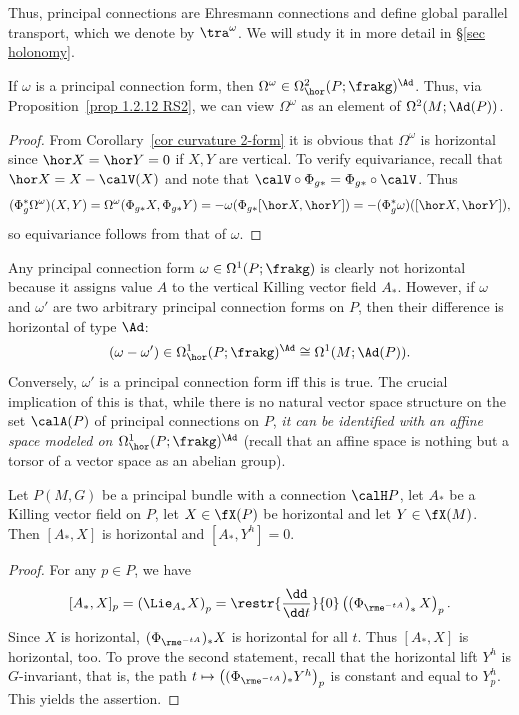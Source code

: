Thus, principal connections are Ehresmann connections and define global parallel transport, which we denote by $\tra^\omega$. We will study it in more detail in \S\ref{sec holonomy}.


\begin{cor}
    If $\omega$ is a principal connection form, then $\Omega^\omega\in \Omega^2_{\hor}(P;\frakg)^\Ad$. Thus, via Proposition~\ref{prop 1.2.12 RS2}, we can view $\Omega^\omega$ as an element of $\Omega^2(M;\Ad(P))$.
\end{cor}
\begin{proof}
    From Corollary~\ref{cor curvature 2-form} it is obvious that $\Omega^\omega$ is horizontal since $\hor X=\hor Y=0$ if $X,Y$ are vertical. To verify equivariance, recall that $\hor X=X-\calV(X)$ and note that $\calV\circ \Phi_{g\ast}=\Phi_{g\ast}\circ \calV$. Thus 
    \[(\Phi_{g}^\ast\Omega^\omega)(X,Y)=\Omega^\omega(\Phi_{g\ast}X,\Phi_{g\ast}Y)=-\omega(\Phi_{g\ast}[\hor X,\hor Y])=-(\Phi_{g}^\ast\omega)([\hor X,\hor Y]),\]
    so equivariance follows from that of $\omega$.
\end{proof}


\begin{rem}
    Any principal connection form $\omega\in\Omega^1(P;\frakg)$ is clearly not horizontal because it assigns value $A$ to the vertical Killing vector field $A_\ast$. 
    However, if $\omega$ and $\omega'$ are two arbitrary principal connection forms on $P$, then their difference is horizontal of type $\Ad$:
    \[(\omega-\omega')\in \Omega^1_{\hor}(P;\frakg)^\Ad\cong \Omega^1(M;\Ad(P)).\]
    Conversely, $\omega'$ is a principal connection form iff this is true. The crucial implication of this is that, while there is no natural vector space structure on the set $\calA(P)$ of principal connections on $P$, \emph{it can be identified with an affine space modeled on $\Omega^1_{\hor}(P;\frakg)^\Ad$} (recall that an affine space is nothing but a torsor of a vector space as an abelian group).
\end{rem}


\begin{lem}[{{\cite[Lem.~1.4.2]{RS2}}}]\label{lem 1.4.2 RS2}
    Let $P(M,G)$ be a principal bundle with a connection $\calH P$, let $A_\ast$ be a Killing vector field on $P$, let $X\in\fX(P)$ be horizontal and let $Y\in \fX(M)$. Then $[A_\ast,X]$ is horizontal and $[A_\ast,Y^h]=0$.
\end{lem}
\begin{proof}
    For any $p\in P$, we have
    \[[A_\ast,X]_p=\left(\Lie_{A_\ast}X\right)_p=\restr{\frac{\dd}{\dd t}}{0} \left(\left(\Phi_{\rme^{-tA}}\right)_\ast X\right)_p.\]
    Since $X$ is horizontal, $(\Phi_{\rme^{-tA}})_\ast X$ is horizontal for all $t$. Thus $[A_\ast,X]$ is horizontal, too. To prove the second statement, recall that the horizontal lift $Y^h$ is $G$-invariant, that is, the path $t\mapsto \left((\Phi_{\rme^{-tA}})_\ast Y^h\right)_p$ is constant and equal to $Y^h_p$. This yields the assertion.
\end{proof}


